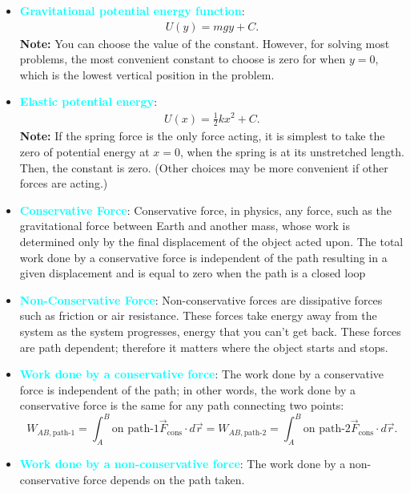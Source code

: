 \documentclass{report}
\begin{document}
\begin{itemize}
        \item \textbf{\textcolor{cyan}{Gravitational potential energy function}}:
            \begin{align*}
                U(y) = mgy + C
            .\end{align*}
            \bigbreak \noindent 
            \textbf{Note:} You can choose the value of the constant. However, for solving most problems, the most convenient constant to choose is zero for when $y=0$, which is the lowest vertical position in the problem. 
        \item \textbf{\textcolor{cyan}{Elastic potential energy}}:
            \begin{align*}
                U(x) = \frac{1}{2}kx^{2} + C 
            .\end{align*}
            \bigbreak \noindent 
            \textbf{Note:} If the spring force is the only force acting, it is simplest to take the zero of potential energy at $x=0$, when the spring is at its unstretched length. Then, the constant is zero. (Other choices may be more convenient if other forces are acting.)
        \item \textbf{\textcolor{cyan}{Conservative Force}}: Conservative force, in physics, any force, such as the gravitational force between Earth and another mass, whose work is determined only by the final displacement of the object acted upon. The total work done by a conservative force is independent of the path resulting in a given displacement and is equal to zero when the path is a closed loop
        \item \textbf{\textcolor{cyan}{Non-Conservative Force}}: Non-conservative forces are dissipative forces such as friction or air resistance. These forces take energy away from the system as the system progresses, energy that you can’t get back. These forces are path dependent; therefore it matters where the object starts and stops.
        \item \textbf{\textcolor{cyan}{Work done by a conservative force}}: The work done by a conservative force is independent of the path; in other words, the work done by a conservative force is the same for any path connecting two points:
            \[
                W_{AB,\text{path-1}} = \int_{A}^{B} \text{on path-1} \vec{F}_{\text{cons}} \cdot d\vec{r} = W_{AB,\text{path-2}} = \int_{A}^{B} \text{on path-2} \vec{F}_{\text{cons}} \cdot d\vec{r}.
            \]
        \item \textbf{\textcolor{cyan}{Work done by a non-conservative force}}: The work done by a non-conservative force depends on the path taken.

\end{itemize}
\end{document}
